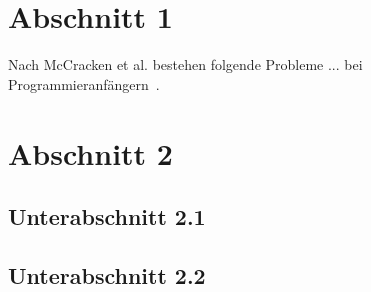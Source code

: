 \section{Abschnitt 1}
Nach McCracken et al. bestehen folgende Probleme ... bei Programmieranfängern~\cite{McCracken2001}.

\section{Abschnitt 2}
\subsection{Unterabschnitt 2.1}
\subsection{Unterabschnitt 2.2}
